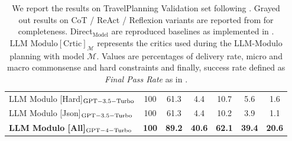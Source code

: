 \begin{table}[ht]
\begin{tabular}{lc|cc|cc|c}
        LLM Modulo [Hard]$_{\rm GPT-3.5-Turbo}$ & 100 & 61.3 & 4.4 & 10.7 & 5.6 & 1.6 \\
        LLM Modulo [Json]$_{\rm GPT-3.5-Turbo}$ & 100 & 61.3 & 4.4 & 10.2 & 3.9 & 1.1 \\
        \textbf{LLM Modulo [All]$_{\rm GPT-4-Turbo}$} & \textbf{100} & \textbf{89.2} & \textbf{40.6} & \textbf{62.1} & \textbf{39.4} & \textbf{20.6} \\
        \bottomrule
    \end{tabular}
    \caption{
    We report the results on TravelPlanning Validation set following \cite{xie2024travelplanner}. Grayed out results on CoT / ReAct / Reflexion variants are reported from \cite{xie2024travelplanner} for completeness. Direct$_{\text{Model}}$ are reproduced baselines as implemented in \cite{xie2024travelplanner}. $\text{LLM Modulo}[\text{Crtic}]_{\mathcal{M}}$ represents the critics used during the LLM-Modulo planning with model $\mathcal{M}$. Values are percentages of delivery rate, micro and macro commonsense and hard constraints and finally, success rate defined as \textit{Final Pass Rate} as in \cite{xie2024travelplanner}.
    }
    \label{fig:travel-planning}\label{tab:model_performance}
\end{table}